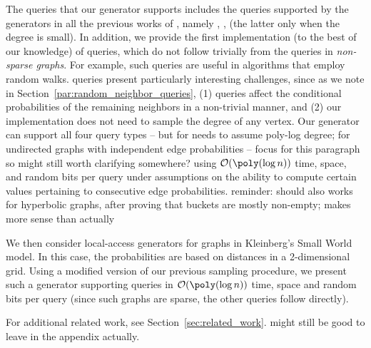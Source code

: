 The queries that our generator supports includes the queries supported by the generators
in all the previous works of \cite{reut, huge_old, huge, sparse},
   namely , , 
(the latter only when the degree is small).
In addition, we provide the first implementation (to the best of our knowledge)
of  queries, which do not follow trivially from the
 queries in \emph{non-sparse graphs}.  For example,
such queries are useful in algorithms that employ random walks.
 queries
present particularly interesting challenges,  since as we note in 
Section~\ref{par:random_neighbor_queries},
(1)  queries affect the conditional probabilities
of the remaining neighbors in a non-trivial manner, and
(2) our implementation does not need to sample the degree of any vertex.
Our generator can support all {\color{red}four query types -- but for  needs to assume poly-log degree;}
{\color{red} for undirected graphs with independent edge probabilities -- focus for this paragraph so might still worth clarifying somewhere?} %
using $\mathcal{O}(\poly(\log n))$ time, space, and random bits
per query under assumptions on the ability to compute certain values
pertaining to consecutive edge probabilities. %
{\color{red} reminder: should also works for hyperbolic graphs, after proving that buckets are mostly non-empty;  makes more sense than  actually}

We then consider local-access generators for graphs in Kleinberg's Small World model.
In this case, the probabilities are based on distances in a 2-dimensional grid.
Using  a modified version of our previous sampling procedure,
we present such a generator supporting  queries in 
$\mathcal{O}(\poly(\log n))$ time, space and random bits per query (since such graphs
are sparse, the other queries follow directly).

For additional related work, see Section~\ref{sec:related_work}. {\color{red} might still be good to leave in the appendix actually.}

%


